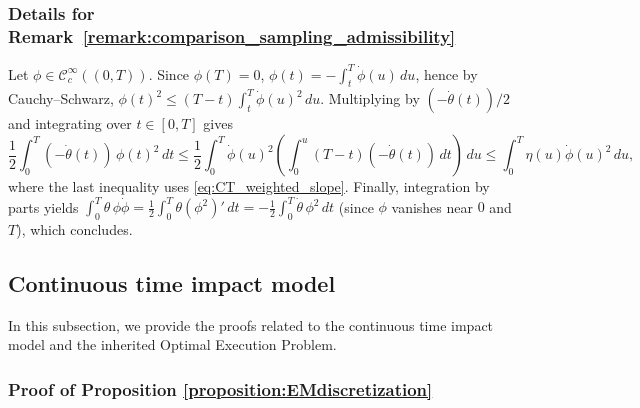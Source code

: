 \documentclass[final,3p,authoryear,12pt]{elsarticle}
\begin{document}
\subsubsection{Details for Remark~\ref{remark:comparison_sampling_admissibility}}

Let $\phi\in \mathcal{C}^{\infty}_{c}((0,T))$. Since $\phi(T)=0$,
$\phi(t)=-\int_t^T \dot\phi(u)\,du$, hence by Cauchy--Schwarz,
$\phi(t)^2\le (T-t)\int_t^T \dot\phi(u)^2\,du$.
Multiplying by $(-\dot\theta(t))/2$ and integrating over $t\in[0,T]$ gives
\[
\frac12\int_0^T (-\dot\theta(t))\,\phi(t)^2\,dt
\le
\frac12\int_0^T \dot\phi(u)^2
\left(\int_0^u (T-t)(-\dot\theta(t))\,dt\right)\,du
\le
\int_0^T \eta(u)\dot\phi(u)^2\,du,
\]
where the last inequality uses \eqref{eq:CT_weighted_slope}.
Finally, integration by parts yields
$\int_0^T \theta\,\phi\dot\phi
= \frac12\int_0^T \theta(\phi^2)'\,dt
= -\frac12\int_0^T \dot\theta\,\phi^2\,dt$
(since $\phi$ vanishes near $0$ and $T$), which concludes.

\subsection{Continuous time impact model}

In this subsection, we provide the proofs related to the continuous time impact model and the inherited Optimal Execution Problem.

\subsubsection{Proof of Proposition \ref{proposition:EMdiscretization}}
\end{document}

